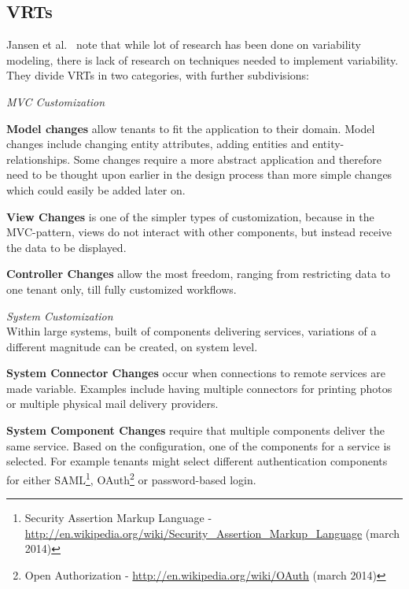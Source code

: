 \subsection{\aclp{VRT}}
\label{sec:vrt}
Jansen et al.~\cite{jansen2010customization} note that while lot of research has been done on variability modeling, there is lack of research on techniques needed to implement variability. They divide \acp{VRT} in two categories, with further subdivisions:
\begin{compactitem}
\item \textit{\ac{MVC} Customization}
\begin{compactitem}
\item \textbf{Model changes} allow tenants to fit the application to their domain. Model changes include changing entity attributes, adding entities and entity-relationships. Some changes require a more abstract application and therefore need to be thought upon earlier in the design process than more simple changes which could easily be added later on.
\item \textbf{View Changes} is one of the simpler types of customization, because in the \ac{MVC}-pattern, views do not interact with other components, but instead receive the data to be displayed.
\item \textbf{Controller Changes} allow the most freedom, ranging from restricting data to one tenant only, till fully customized workflows.
\end{compactitem}
\item \textit{System Customization} \\ Within large systems, built of components delivering services, variations of a different magnitude can be created, on system level.
\begin{compactitem}
\item \textbf{System Connector Changes} occur when connections to remote services are made variable. Examples include having multiple connectors for printing photos or multiple physical mail delivery providers.
\item \textbf{System Component Changes} require that multiple components deliver the same service. Based on the configuration, one of the components for a service is selected. For example tenants might select different authentication components for either SAML\footnote{Security Assertion Markup Language - \url{http://en.wikipedia.org/wiki/Security_Assertion_Markup_Language} (march 2014)}, OAuth\footnote{Open Authorization - \url{http://en.wikipedia.org/wiki/OAuth} (march 2014)} or password-based login.
\end{compactitem}
\end{compactitem}

